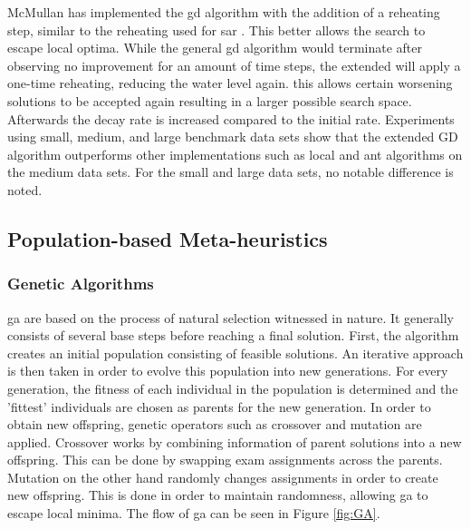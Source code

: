 McMullan \cite{mcmullan2007} has implemented the \acrlong{gd} algorithm with the addition of a reheating step, similar to the reheating used for \acrlong{sar} \cite{Goh2017}. This better allows the search to escape local optima. While the general \acrshort{gd} algorithm would terminate after observing no improvement for an amount of time steps, the extended will apply a one-time reheating, reducing the water level again. this allows certain worsening solutions to be accepted again resulting in a larger possible search space. Afterwards the decay rate is increased compared to the initial rate. Experiments using small, medium, and large benchmark data sets show that the extended GD algorithm outperforms other implementations such as \acrlong{local} and ant algorithms on the medium data sets. For the small and large data sets, no notable difference is noted.


\subsection{Population-based Meta-heuristics}
\subsubsection{Genetic Algorithms}

\acrfull{ga} \cite{Holland1975} are based on the process of natural selection witnessed in nature. It generally consists of several base steps before reaching a final solution. First, the algorithm creates an initial population consisting of feasible solutions. An iterative approach is then taken in order to evolve this population into new generations. For every generation, the fitness of each individual in the population is determined and the 'fittest' individuals are chosen as parents for the new generation. In order to obtain new offspring, genetic operators such as crossover and mutation are applied. Crossover works by combining information of parent solutions into a new offspring. This can be done by swapping exam assignments across the parents. Mutation on the other hand randomly changes assignments in order to create new offspring. This is done in order to maintain randomness, allowing \acrshort{ga} to escape local minima. The flow of \acrlong{ga} can be seen in Figure \ref{fig:GA}.


